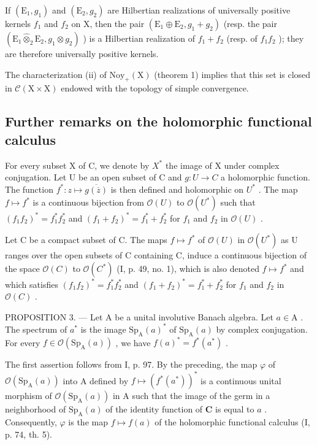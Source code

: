If \((\mathrm{E}_{1}, g_{1})\) and \((\mathrm{E}_{2}, g_{2})\) are Hilbertian realizations of universally positive kernels \(f_{1}\) and \(f_{2}\) on X, then the pair \((\mathrm{E}_{1} \oplus \mathrm{E}_{2}, g_{1} + g_{2})\) (resp. the pair \((\mathrm{E}_{1} \widehat{\otimes}_{2} \mathrm{E}_{2}, g_{1} \otimes g_{2})\) ) is a Hilbertian realization of \(f_{1} + f_{2}\) (resp. of \(f_{1}f_{2}\) ); they are therefore universally positive kernels.

The characterization (ii) of \(\mathrm{Noy}_{+}(\mathrm{X})\) (theorem 1) implies that this set is closed in \(\mathcal{C}(\mathrm{X}\times\mathrm{X})\) endowed with the topology of simple convergence.

\subsection{Further remarks on the holomorphic functional calculus}

For every subset X of C, we denote by \(X^{*}\) the image of X under complex conjugation. Let U be an open subset of C and \(g: U \to C\) a holomorphic function. The function \(f^{*}: z \mapsto \overline{g(\overline{z})}\) is then defined and holomorphic on \(U^{*}\) . The map \(f \mapsto f^{*}\) is a continuous bijection from \(\mathcal{O}(U)\) to \(\mathcal{O}(U^{*})\) such that \((f_{1}f_{2})^{*} = f_{1}^{*}f_{2}^{*}\) and \((f_{1} + f_{2})^{*} = f_{1}^{*} + f_{2}^{*}\) for \(f_{1}\) and \(f_{2}\) in \(\mathcal{O}(U)\) .

Let C be a compact subset of C. The maps \(f \mapsto f^{*}\) of \(\mathcal{O}(U)\) in \(\mathcal{O}(U^{*})\) as U ranges over the open subsets of C containing C, induce a continuous bijection of the space \(\mathcal{O}(C)\) to \(\mathcal{O}(C^{*})\) (I, p. 49, no. 1), which is also denoted \(f \mapsto f^{*}\) and which satisfies \((f_{1}f_{2})^{*} = f_{1}^{*}f_{2}^{*}\) and \((f_{1} + f_{2})^{*} = f_{1}^{*} + f_{2}^{*}\) for \(f_{1}\) and \(f_{2}\) in \(\mathcal{O}(C)\) .

PROPOSITION 3. --- Let A be a unital involutive Banach algebra. Let \(a \in \mathrm{A}\) . The spectrum of \(a^{*}\) is the image \(\mathrm{Sp}_{\mathrm{A}}(a)^{*}\) of \(\mathrm{Sp}_{\mathrm{A}}(a)\) by complex conjugation. For every \(f \in \mathcal{O}(\mathrm{Sp}_{\mathrm{A}}(a))\) , we have \(f(a)^{*} = f^{*}(a^{*})\) .

The first assertion follows from I, p. 97. By the preceding, the map \(\varphi\) of \(\mathcal{O}(\mathrm{Sp}_{\mathrm{A}}(a))\) into A defined by \(f \mapsto (f^{*}(a^{*}))^{*}\) is a continuous unital morphism of \(\mathcal{O}(\mathrm{Sp}_{\mathrm{A}}(a))\) in A such that the image of the germ in a neighborhood of \(\mathrm{Sp}_{\mathrm{A}}(a)\) of the identity function of \(\mathbf{C}\) is equal to \(a\) . Consequently, \(\varphi\) is the map \(f \mapsto f(a)\) of the holomorphic functional calculus (I, p. 74, th. 5).


